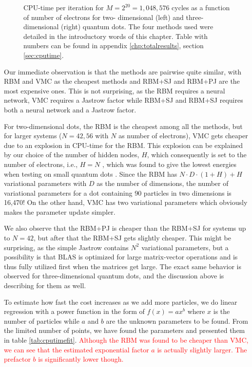\begin{figure}[h]
	\centering 
	
	\caption{CPU-time per iteration for $M=2^{20}=1,048,576$ cycles as a function of number of electrons for two- dimensional (left) and three-dimensional (right) quantum dots. The four methods used were detailed in the introductory words of this chapter. Table with numbers can be found in appendix \ref{chp:totalresults}, section \ref{sec:cputime}.}
	\label{fig:cpu_time}
\end{figure} 

Our immediate observation is that the methods are pairwise quite similar, with RBM and VMC as the cheapest methods and RBM+SJ and RBM+PJ are the most expensive ones. This is not surprising, as the RBM requires a neural network, VMC requires a Jastrow factor while RBM+SJ and RBM+SJ requires both a neural network and a Jastrow factor. 

For two-dimensional dots, the RBM is the cheapest among all the methods, but for larger systems ($N=42,56$ with $N$ as number of electrons), VMC gets cheaper due to an explosion in CPU-time for the RBM. This explosion can be explained by our choice of the number of hidden nodes, $H$, which consequently is set to the number of electrons, i.e., $H=N$ , which was found to give the lowest energies when testing on small quantum dots \cite{nordhagen_computational_2018}. Since the RBM has $N\cdot D\cdot (1+H)+H$ variational parameters with $D$ as the number of dimensions, the number of variational parameters for a dot containing 90 particles in two dimensions is 16,470! On the other hand, VMC has two variational parameters which obviously makes the parameter update simpler. 

We also observe that the RBM+PJ is cheaper than the RBM+SJ for systems up to $N=42$, but after that the RBM+SJ gets slightly cheaper. This might be surprising, as the simple Jastrow contains $N^2$ variational parameters, but a possibility is that BLAS is optimized for large matrix-vector operations and is thus fully utilized first when the matrices get large. The exact same behavior is observed for three-dimensional quantum dots, and the discussion above is describing for them as well.

To estimate how fast the cost increases as we add more particles, we do linear regression with a power function in the form of $f(x)= ax^b$ where $x$ is the number of particles while $a$ and $b$ are the unknown parameters to be found. From the limited number of points, we have found the parameters and presented them in table \eqref{tab:cputimefit}. \textcolor{red}{Although the RBM was found to be cheaper than VMC, we can see that the estimated exponential factor $a$ is actually slightly larger. The prefactor $b$ is significantly lower though.}

